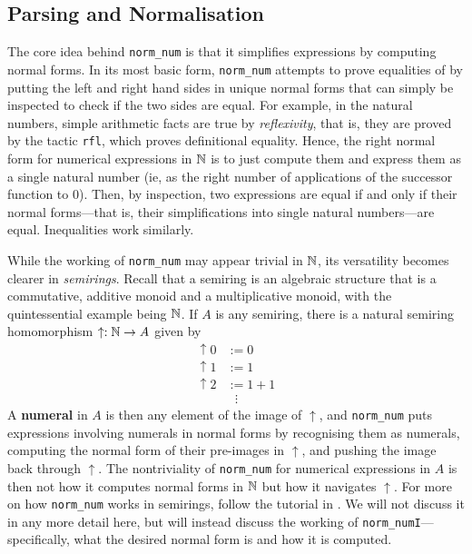 \subsection{Parsing and Normalisation}

The core idea behind \lstinline|norm_num| is that it simplifies expressions by computing normal forms. In its most basic form, \lstinline|norm_num| attempts to prove equalities of by putting the left and right hand sides in unique normal forms that can simply be inspected to check if the two sides are equal. For example, in the natural numbers, simple arithmetic facts are true by \textit{reflexivity}, that is, they are proved by the tactic \lstinline|rfl|, which proves definitional equality. Hence, the right normal form for numerical expressions in $\mathbb{N}$ is to just compute them and express them as a single natural number (ie, as the right number of applications of the successor function to $0$). Then, by inspection, two expressions are equal if and only if their normal forms---that is, their simplifications into single natural numbers---are equal. Inequalities work similarly.

While the working of \lstinline|norm_num| may appear trivial in $\mathbb{N}$, its versatility becomes clearer in \textit{semirings}. Recall that a semiring is an algebraic structure that is a commutative, additive monoid and a multiplicative monoid, with the quintessential example being $\mathbb{N}$. If $A$ is any semiring, there is a natural semiring homomorphism $\uparrow : \mathbb{N} \to A$ given by
\begin{align*}
    \uparrow\!0 &:= 0 \\
    \uparrow\!1 &:= 1 \\
    \uparrow\!2 &:= 1 + 1 \\
    &\ \ \ \vdots
\end{align*}
A \textbf{numeral} in $A$ is then any element of the image of $\uparrow$, and \lstinline|norm_num| puts expressions involving numerals in normal forms by recognising them as numerals, computing the normal form of their pre-images in $\uparrow$, and pushing the image back through $\uparrow$. The nontriviality of \lstinline|norm_num| for numerical expressions in $A$ is then not how it computes normal forms in $\mathbb{N}$ but how it navigates $\uparrow$. For more on how \lstinline|norm_num| works in semirings, follow the tutorial in \cite[\texttt{Metaprogramming/NormNum}]{HeatherMetaprogramming}. We will not discuss it in any more detail here, but will instead discuss the working of \lstinline|norm_numI|---specifically, what the desired normal form is and how it is computed.

